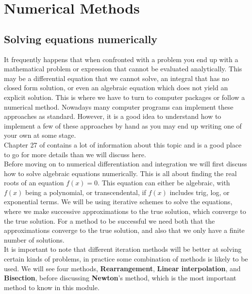 
\chapter{Numerical Methods}
\label{sec:numerics}

\section{Solving equations numerically}
It frequently happens that when confronted with a problem you end up with a mathematical problem or expression that cannot be evaluated analytically. This may be a differential equation that we cannot solve, an integral that has no closed form solution, or even an algebraic equation which does not yield an explicit solution. This is where we have to turn to computer packages or follow a numerical method. Nowadays many computer programs can implement these approaches as standard. However, it is a good idea to understand how to implement a few of these approaches by hand as you may end up writing one of your own at some stage.\\

Chapter 27 of \citep{riley_mathematical_2006}  contains a lot of information about this topic and is a good place to go for more details than we will discuss here.\\

Before moving on to numerical differentiation and integration we will first discuss how to solve algebraic equations numerically. This is all about finding the real roots of an equation $f(x)=0$. This equation can either be algebraic, with $f(x)$ being a polynomial, or transcendental, if $f(x)$ includes trig, log, or exponential terms. We will be using iterative schemes to solve the equations, where we make successive approximations to the true solution, which converge to the true solution. For a method to be successful we need both that the approximations converge to the true solution, and also that we only have a finite number of solutions.\\

It is important to note that different iteration methods will be better at solving certain kinds of problems, in practice some combination of methods is likely to be used. We will see four methods, \textbf{Rearrangement}, \textbf{Linear interpolation}, and \textbf{Bisection}, before discussing \textbf{Newton}'s method, which is the most important method to know in this module. 


